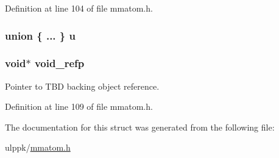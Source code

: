 Definition at line 104 of file mmatom.\-h.

\hypertarget{struct_m_m_a___h_a_n_d_l_e_a21169edfbd2efc332a0f67d74f5cd29b}{
\subsubsection[{u}]{\setlength{\rightskip}{0pt plus 5cm}union \{ ... \}   u}}\label{struct_m_m_a___h_a_n_d_l_e_a21169edfbd2efc332a0f67d74f5cd29b}
\hypertarget{struct_m_m_a___h_a_n_d_l_e_afa66c4821cc82b1e7f2ea0bbf3d6da7c}{
\subsubsection[{void\-\_\-refp}]{\setlength{\rightskip}{0pt plus 5cm}void$\ast$ void\-\_\-refp}}\label{struct_m_m_a___h_a_n_d_l_e_afa66c4821cc82b1e7f2ea0bbf3d6da7c}


Pointer to T\-B\-D backing object reference. 



Definition at line 109 of file mmatom.\-h.



The documentation for this struct was generated from the following file\-:\begin{DoxyCompactItemize}
\item 
ulppk/\hyperlink{mmatom_8h}{mmatom.\-h}\end{DoxyCompactItemize}
